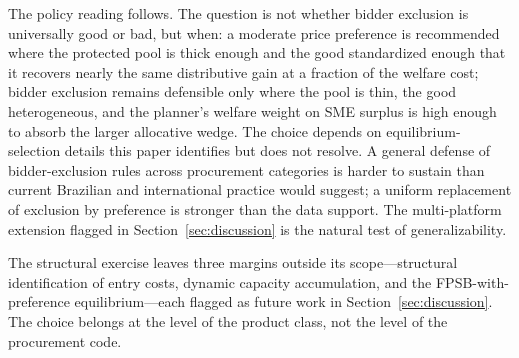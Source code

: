 The policy reading follows. The question is not whether bidder exclusion is universally good or bad, but when: a moderate price preference is recommended where the protected pool is thick enough and the good standardized enough that it recovers nearly the same distributive gain at a fraction of the welfare cost; bidder exclusion remains defensible only where the pool is thin, the good heterogeneous, and the planner's welfare weight on SME surplus is high enough to absorb the larger allocative wedge. The choice depends on equilibrium-selection details this paper identifies but does not resolve. A general defense of bidder-exclusion rules across procurement categories is harder to sustain than current Brazilian and international practice would suggest; a uniform replacement of exclusion by preference is stronger than the data support. The multi-platform extension flagged in Section~\ref{sec:discussion} is the natural test of generalizability.

The structural exercise leaves three margins outside its scope---structural identification of entry costs, dynamic capacity accumulation, and the FPSB-with-preference equilibrium---each flagged as future work in Section~\ref{sec:discussion}. The choice belongs at the level of the product class, not the level of the procurement code.
